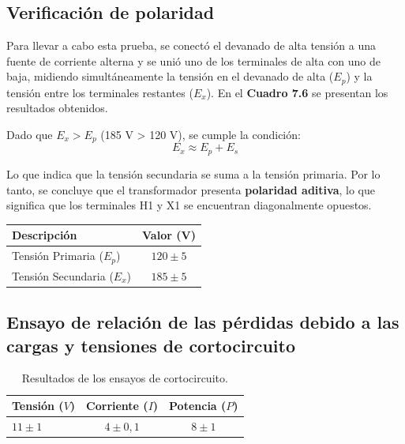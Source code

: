 \subsection{Verificación de polaridad}
Para llevar a cabo esta prueba, se conectó el devanado de alta tensión a una fuente de corriente alterna y se unió uno de los terminales de alta con uno de baja, midiendo simultáneamente la tensión en el devanado de alta ($E_p$) y la tensión entre los terminales restantes ($E_x$). En el \textbf{Cuadro 7.6} se presentan los resultados obtenidos.

Dado que $E_x > E_p$ (185 V > 120 V), se cumple la condición:
\begin{equation}
E_x \approx E_p + E_s \tag{7.3}
\end{equation}

Lo que indica que la tensión secundaria se suma a la tensión primaria. Por lo tanto, se concluye que el transformador presenta \textbf{polaridad aditiva}, lo que significa que los terminales H1 y X1 se encuentran diagonalmente opuestos.
\begin{center}
    \renewcommand{\arraystretch}{1.3}
    \begin{tabular}{lc}
    \toprule
    \textbf{Descripción} & \textbf{Valor (V)} \\ 
    \midrule
    Tensión Primaria ($E_p$) & $120 \pm 5$ \\
    Tensión Secundaria ($E_x$) & $185 \pm 5$ \\
    \bottomrule
    \end{tabular}
\end{center}


\subsection{Ensayo de relación de las pérdidas debido a las cargas y tensiones de cortocircuito}

\begin{table}[H]
\centering
\caption{Resultados de los ensayos de cortocircuito.}
\renewcommand{\arraystretch}{1.3}
\begin{tabular}{lcc}
\toprule
\textbf{Tensión ($V$)} & \textbf{Corriente ($I$)} & \textbf{Potencia ($P$)} \\
\midrule
$11 \pm 1$ & $4 \pm 0,1$ & $8 \pm 1$ \\
\bottomrule
\end{tabular}
\end{table}

